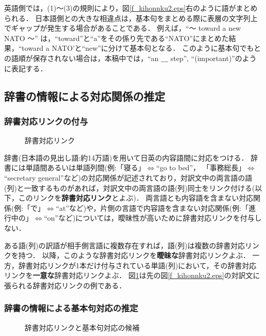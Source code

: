 英語側では，(1)〜(3)の規則により，図\ref{f_kihonnku2.eps}右のように語がまとめられる．
日本語側との大きな相違点は，基本句をまとめる際に表層の文字列上でギャップが発生する場合があることである．
例えば，``〜 toward a new NATO 〜'' は，``toward''と``a''をその係り先である``NATO''にまとめた結果，``toward a NATO'と``new''に分けて基本句となる．
このように基本句でもとの語順が保存されない場合は，本稿中では，``an ＿ step'', ``(important)''のように表記する．


\subsection{辞書の情報による対応関係の推定}
\subsubsection{辞書対応リンクの付与}

\begin{figure}
\begin{center}
 \leavevmode
 \epsfxsize=11cm
 \epsfysize=8.2cm
\end{center}
\caption{辞書対応リンク}
\label{f_d-link.eps}
\end{figure}

辞書(日本語の見出し語:約14万語)を用いて日英の内容語間に対応をつける．
辞書には単語間あるいは単語列間(例:「寝る」$\Leftrightarrow$``go to bed''， 「事務総長」$\Leftrightarrow$``secretary general''など)の対応関係が記述されており，対訳文中の両言語の語(列)と一致するものがあれば，対訳文中の両言語の語(列)同士をリンク付ける(以下，このリンクを{\bf 辞書対応リンク}とよぶ)．
両言語とも内容語を含まない対応関係(例:「で」$\Leftrightarrow$``at''など)や，片側の言語で内容語を含まない対応関係(例:「進行中の」$\Leftrightarrow$``on''など)については，曖昧性が高いために辞書対応リンクを付与しない．

ある語(列)の訳語が相手側言語に複数存在すれば，語(列)は複数の辞書対応リンクを持つ．
以降，このような辞書対応リンクを{\bf 曖昧な}辞書対応リンクよぶ．
一方，辞書対応リンクが1本だけ付与されている単語(列)において，その辞書対応リンクを{\bf 一意な}辞書対応リンクよぶ．
図\ref{f_d-link.eps}は先の図\ref{f_kihonnku2.eps}の対訳文に張られる辞書対応リンクの例である．


\subsubsection{辞書の情報による基本句対応の推定}

\begin{figure}
\begin{center}
 \leavevmode
 \epsfxsize=11cm
 \epsfysize=8.2cm
\end{center}
\caption{辞書対応リンクと基本句対応の候補}
\label{f_kouho4.eps}
\end{figure}



